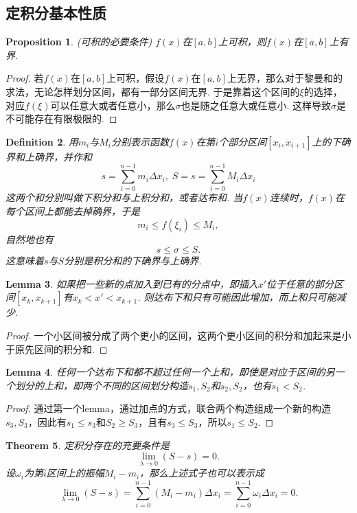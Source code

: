 \documentclass{article}
\newtheorem{theorem}{Theorem}[section]
\newtheorem{lemma}[theorem]{Lemma}
\newtheorem{proposition}[theorem]{Proposition}
\newtheorem{definition}[theorem]{Definition}
\begin{document}
\subsection{定积分基本性质}

\begin{proposition}
\rm {\color{red} (可积的必要条件)} $f(x)$在$[a,b]$上可积，则$f(x)$在$[a,b]$上有界.
\end{proposition}

\begin{proof}
若$f(x)$在$[a,b]$上可积，假设$f(x)$在$[a,b]$上无界，那么对于黎曼和的求法，无论怎样划分区间，都有一部分区间无界. 于是靠着这个区间的$\xi$的选择，对应$f(\xi)$可以任意大或者任意小，那么$\sigma$也是随之任意大或任意小. 这样导致$\sigma$是不可能存在有限极限的. 
\end{proof}

\begin{definition}
\rm 用$m_i$与$M_i$分别表示函数$f(x)$在第$i$个部分区间$[x_i,x_{i+1}]$上的下确界和上确界，并作和
$$
s = \sum\limits_{i=0}^{n-1}m_i\Delta x_i,\; S = s = \sum\limits_{i=0}^{n-1}M_i\Delta x_i
$$
这两个和分别叫做{\color{red}下积分}和与{\color{red}上积分和}，或者{\color{red}达布和}. 当$f(x)$连续时，$f(x)$在每个区间上都能去掉确界，于是
$$
m_i \leq f(\xi_i) \leq M_i,
$$ 
自然地也有
$$
s \leq \sigma \leq S.
$$
这意味着$s$与$S$分别是积分和的下确界与上确界.
\end{definition}


\begin{lemma}
\rm 如果把一些新的点加入到已有的分点中，即插入$x'$位于任意的部分区间$[x_k,x_{k+1}]$有$x_k < x' < x_{k+1}$. 则达布下和只有可能因此增加，而上和只可能减少.
\end{lemma}

\begin{proof}
一个小区间被分成了两个更小的区间，这两个更小区间的积分和加起来是小于原先区间的积分和.
\end{proof}

\begin{lemma}
\rm 任何一个达布下和都不超过任何一个上和，即使是对应于区间的另一个划分的上和，即两个不同的区间划分构造$s_1,S_2$和$s_2,S_2$，也有$s_1 < S_2$.
\end{lemma}

\begin{proof}
通过第一个lemma，通过加点的方式，联合两个构造组成一个新的构造$s_3,S_3$，因此有$s_1 \leq s_3$和$S_2 \geq S_3$，且有$s_3 \leq S_3$，所以$s_1 \leq S_2$.
\end{proof}

\begin{theorem}
\rm {\color{red}定积分存在的充要条件}是
$$
\lim\limits_{\lambda \rightarrow 0} (S-s) = 0.
$$
设$\omega_i$为第$i$区间上的{\color{red}振幅}$M_i - m_i$，那么上述式子也可以表示成
$$
\lim\limits_{\lambda \rightarrow 0} (S-s) = \sum\limits_{i=0}^{n-1} (M_i-m_i) \Delta x_i = \sum\limits_{i=0}^{n-1} \omega_i \Delta x_i = 0.
$$
\end{theorem}
\end{document}
